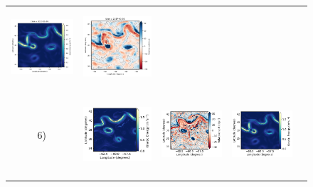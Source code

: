 \documentclass[draft]{agujournal2019}
\begin{document}
\begin{figure}[H]
\begin{center}
\begin{tabular}{ccccc}
\includegraphics[trim={13mm 13mm 22mm 6mm},clip, width=2.9cm,height=2.9cm]{figures/plots/enatl60-t_rec_ke.png} &
\includegraphics[trim={13mm 13mm 22mm 6mm},clip,width=2.9cm,height=2.9cm]{figures/plots/enatl60-t_rec_vort_r.png} \\
 \hspace{-10mm} 6) &
 \includegraphics[trim={0 0 25mm 5mm},clip, width=3.3cm,height=3.1cm]{figures/plots2/enatl60-0_train_ke.png} &
 \includegraphics[trim={18mm 0 26mm 5mm},clip, width=2.9cm,height=3.1cm]{figures/plots2/enatl60-0_train_vort_r.png} &
 \includegraphics[trim={18mm 0 26mm 5mm},clip, width=2.9cm,height=3.1cm]{figures/plots2/enatl60-0_rec_ke.png} &

\end{tabular}
\end{center}
\end{figure}
\end{document}
